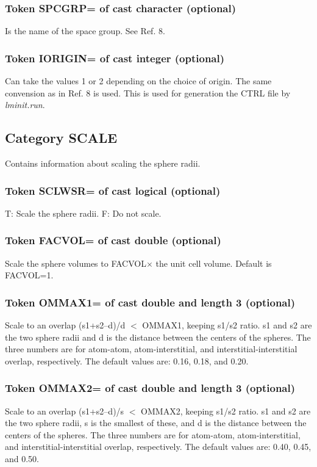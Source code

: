 \documentclass[aps,twocolumn,a4]{revtex4}
\begin{document}
\subsubsection{Token SPCGRP= of cast character (optional)}
Is the name of the space group. See Ref. 8.

\subsubsection{Token IORIGIN= of cast integer (optional)}
Can take the values 1 or 2 depending on the choice of origin. The same
convension as in Ref. 8 is used. This is used for generation the CTRL
file by {\em lminit.run}.

\subsection{Category SCALE}
Contains information about scaling the sphere radii.

\subsubsection{Token SCLWSR= of cast logical (optional)}
T: Scale the sphere radii. F: Do not scale.

\subsubsection{Token FACVOL= of cast double (optional)}
Scale the sphere volumes to FACVOL$\times $ the unit cell volume.
Default is FACVOL=1.

\subsubsection{Token OMMAX1= of cast double and length 3 (optional)}
Scale to an overlap (s1+s2--d)/d $<$ OMMAX1, keeping s1/s2 ratio.
s1 and s2 are the two sphere radii and d is the distance between the
centers of the spheres. The three numbers are for atom-atom,
atom-interstitial, and interstitial-interstitial overlap, respectively.
The default values are: 0.16, 0.18, and 0.20.

\subsubsection{Token OMMAX2= of cast double and length 3 (optional)}
Scale to an overlap (s1+s2--d)/s $<$ OMMAX2, keeping s1/s2 ratio.
s1 and s2 are the two sphere radii, s is the smallest of these, and d
is the distance between the centers of the spheres.
The three numbers are for atom-atom,
atom-interstitial, and interstitial-interstitial overlap, respectively.
The default values are: 0.40, 0.45, and 0.50.
\end{document}
